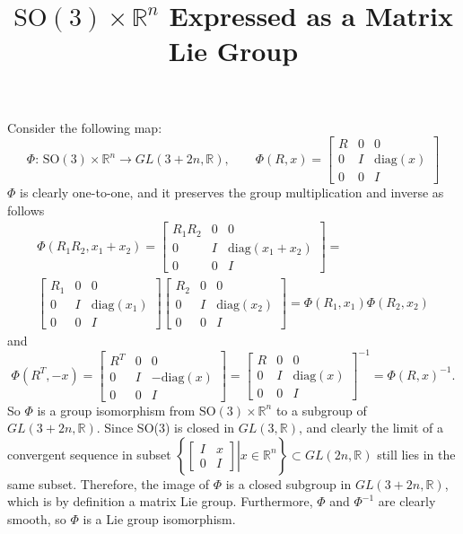 \documentclass[10pt]{article}
\title{\vspace{-4ex}\textbf{$\mathrm{SO}(3)\times\mathbb{R}^n$ Expressed as a Matrix Lie Group\vspace{-4ex}}}
\date{}
\begin{document}
\maketitle

Consider the following map:
\begin{equation*}
	\Phi:\,\mathrm{SO}(3)\times\mathbb{R}^n\to GL(3+2n,\mathbb{R}), \qquad
	\Phi(R,x) = \begin{bmatrix}
		R & 0 & 0 \\
		0 & I & \mathrm{diag}(x) \\
		0 & 0 & I
	\end{bmatrix}
\end{equation*}
$\Phi$ is clearly one-to-one, and it preserves the group multiplication and inverse as follows
\begin{gather*}
	\Phi(R_1R_2,x_1+x_2) = \begin{bmatrix}
		R_1R_2 & 0 & 0 \\
		0 & I & \mathrm{diag}(x_1+x_2) \\
		0 & 0 & I
	\end{bmatrix} = \\
	\begin{bmatrix}
	R_1 & 0 & 0 \\
	0 & I & \mathrm{diag}(x_1) \\
	0 & 0 & I
	\end{bmatrix}\begin{bmatrix}
	R_2 & 0 & 0 \\
	0 & I & \mathrm{diag}(x_2) \\
	0 & 0 & I
	\end{bmatrix} = \Phi(R_1,x_1)\Phi(R_2,x_2)
\end{gather*}
and
\begin{equation*}
	\Phi(R^T,-x) = \begin{bmatrix}
		R^T & 0 & 0 \\
		0 & I & -\mathrm{diag}(x) \\
		0 & 0 & I
	\end{bmatrix} = \begin{bmatrix}
	R & 0 & 0 \\
	0 & I & \mathrm{diag}(x) \\
	0 & 0 & I
	\end{bmatrix}^{-1} = \Phi(R,x)^{-1}.
\end{equation*}
So $\Phi$ is a group isomorphism from $\mathrm{SO}(3)\times\mathbb{R}^n$ to a subgroup of $GL(3+2n,\mathbb{R})$.
Since SO(3) is closed in $GL(3,\mathbb{R})$, and clearly the limit of a convergent sequence in subset $\left\{\left.\begin{bmatrix}
	I & x \\
	0 & I
\end{bmatrix}\right|x\in\mathbb{R}^n\right\}\subset GL(2n,\mathbb{R})$ still lies in the same subset.
Therefore, the image of $\Phi$ is a closed subgroup in $GL(3+2n,\mathbb{R})$, which is by definition a matrix Lie group.
Furthermore, $\Phi$ and $\Phi^{-1}$ are clearly smooth, so $\Phi$ is a Lie group isomorphism.
\end{document}
